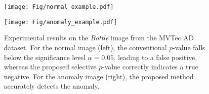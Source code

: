 \begin{figure}[H]
  \centering
  \begin{minipage}[b]{0.46\linewidth}
      \centering
      \texttt{[image: Fig/normal\_example.pdf]}
  \end{minipage}
  \begin{minipage}[b]{0.46\linewidth}
      \centering
      \texttt{[image: Fig/anomaly\_example.pdf]}
  \end{minipage}
  \caption{
    Experimental results on the \textit{Bottle} image from the MVTec AD dataset.
    For the normal image (left), the conventional $p$-value falls below the significance level $\alpha = 0.05$, leading to a false positive, whereas the proposed selective $p$-value correctly indicates a true negative.
    For the anomaly image (right), the proposed method accurately detects the anomaly.
    }
  \label{fig:mvtec_bottle_example}
\end{figure}



